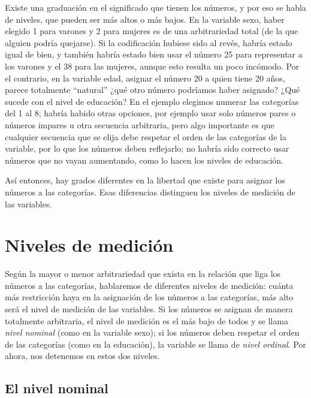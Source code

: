 \documentclass[]{book}
\begin{document}
Existe una graduación en el significado que tienen los números, y por eso se habla de niveles, que pueden ser más altos o más bajos. En la variable sexo, haber elegido 1 para varones y 2 para mujeres es de una arbitrariedad total (de la que alguien podría quejarse). Si la codificación hubiese sido al revés, habría estado igual de bien, y también habría estado bien usar el número 25 para representar a los varones y el 38 para las mujeres, aunque esto resulta un poco incómodo. Por el contrario, en la variable edad, asignar el número 20 a quien tiene 20 años, parece totalmente ``natural'' ¿qué otro número podríamos haber asignado? ¿Qué sucede con el nivel de educación? En el ejemplo elegimos numerar las categorías del 1 al 8; habría habido otras opciones, por ejemplo usar solo números pares o números impares u otra secuencia arbitraria, pero algo importante es que cualquier secuencia que se elija debe respetar el orden de las categorías de la variable, por lo que los números deben reflejarlo; no habría sido correcto usar números que no vayan aumentando, como lo hacen los niveles de educación.

Así entonces, hay grados diferentes en la libertad que existe para asignar los números a las categorías. Esas diferencias distinguen los niveles de medición de las variables.

\hypertarget{niveles-de-medicion}{%
\section{Niveles de medición}\label{niveles-de-medicion}}

Según la mayor o menor arbitrariedad que exista en la relación que liga los números a las categorías, hablaremos de diferentes niveles de medición: cuánta más restricción haya en la asignación de los números a las categorías, más alto será el nivel de medición de las variables. Si los números se asignan de manera totalmente arbitraria, el nivel de medición es el más bajo de todos y se llama \emph{nivel nominal} (como en la variable sexo); si los números deben respetar el orden de las categorías (como en la educación), la variable se llama de \emph{nivel ordinal}. Por ahora, nos detenemos en estos dos niveles.

\hypertarget{el-nivel-nominal}{%
\subsection{El nivel nominal}\label{el-nivel-nominal}}
\end{document}
